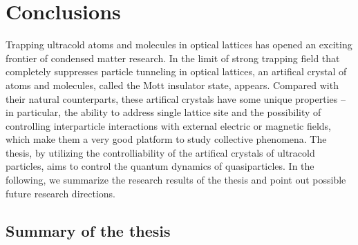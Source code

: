 \chapter{Conclusions}
\label{ch:conclusion}

Trapping ultracold atoms and molecules in optical lattices has opened an exciting frontier of condensed 
matter research\cite{Baranov2012}. In the limit of strong trapping field that completely suppresses particle tunneling
in optical lattices, an artifical crystal of atoms and molecules, called the Mott insulator state, appears. Compared with their natural counterparts, these artifical crystals have some 
unique properties -- in particular, the ability to address single lattice site\cite{atom-mott1, atom-mott1} and the possibility of controlling interparticle interactions with external electric or magnetic fields\cite{quemener2012, Baranov2012},  which make them a very good platform to
study collective phenomena\cite{our-njp-review, quemener2012, Baranov2012}. The thesis, by utilizing  the controlliability of the artifical crystals of ultracold particles, aims to 
control the quantum dynamics
of quasiparticles. 
In the following, we summarize the research results of the thesis and point out possible future research directions.  

\section{Summary of the thesis}

